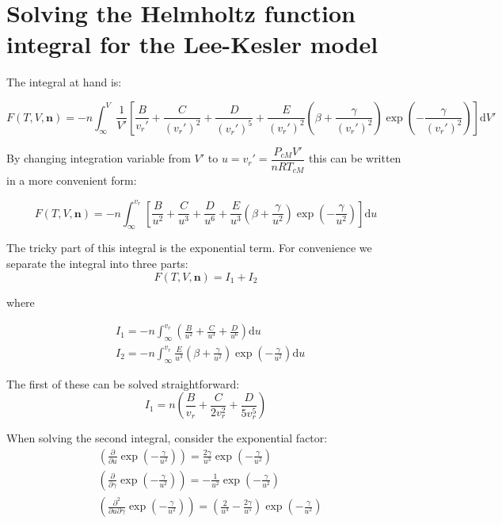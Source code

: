 \documentclass[english]{../thermomemo/thermomemo}
\numberwithin{equation}{section}
\newcommand*{\pd}[2]{\frac{\partial #1}{\partial #2}}
\begin{document}
\section{Solving the Helmholtz function integral for the Lee-Kesler model}
\label{app:integral}
The integral at hand is:

\begin{equation}
F(T,V,\textbf{n}) = - n \int_\infty ^V \frac{1}{V'} \left[\frac{B}{v_r '} + \frac{C}{(v_r ') ^2 } + \frac{D}{(v_r ')^5} + \frac{E}{(v_r ')^2} \left( \beta + \frac{\gamma}{(v_r ')^2} \right) \exp{\left(-\frac{\gamma}{(v_r ')^2}\right)} \right] \mathrm{d}V'
\end{equation}

By changing integration variable from $V'$ to $u = v_r ' = \dfrac{P_{cM} V'}{n R T_{cM}}$ this can be written in a more convenient form:

\begin{equation}
F(T,V,\textbf{n}) = - n \int_\infty ^{v_r} \left[\frac{B}{u^2} + \frac{C}{u^3} + \frac{D}{u^6} + \frac{E}{u^3} \left( \beta + \frac{\gamma}{u^2} \right) \exp{\left(-\frac{\gamma}{u^2}\right)} \right] \mathrm{d}u
\end{equation}

The tricky part of this integral is the exponential term. For convenience we separate the integral into three parts:
\begin{equation}
F(T,V,\textbf{n}) = I_1 + I_2
\end{equation}

where

\begin{align}
& I_1 = - n \int_\infty ^{v_r} \left(\frac{B}{u^2} + \frac{C}{u^3} + \frac{D}{u^6} \right) \mathrm{d}u \\
& I_2 = - n \int_\infty ^{v_r} \frac{E}{u^3} \left(\beta + \frac{\gamma}{u^2} \right) \exp{\left(-\frac{\gamma}{u^2}\right)}  \mathrm{d}u
\end{align}

The first of these can be solved straightforward:
\begin{equation}
I_1 = n \left(\frac{B}{v_r} + \frac{C}{2 v_r^2} + \frac{D}{5 v_r^5} \right)
\end{equation}

When solving the second integral, consider the exponential factor:
\begin{align}
& \left( \pd{}{u} \exp{\left(-\frac{\gamma}{u^2} \right) } \right)= \frac{2 \gamma}{u^3} \exp{\left(-\frac{\gamma}{u^2} \right) }\\
& \left( \pd{}{\gamma} \exp{\left(-\frac{\gamma}{u^2} \right) } \right) = - \frac{1}{u^2}\exp{\left(-\frac{\gamma}{u^2} \right) } \\
& \left(\frac{\partial^2}{\partial u \partial \gamma} \exp{\left(-\frac{\gamma}{u^2}\right)} \right) = \left(\frac{2}{u^3} - \frac{2\gamma}{u^5}\right) \exp{\left(-\frac{\gamma}{u^2}\right)}
\end{align}
\end{document}
